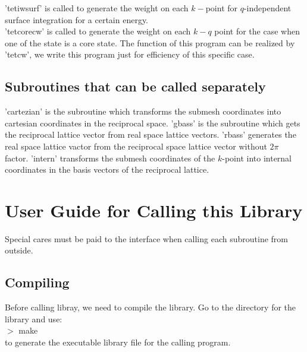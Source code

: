 \documentclass[10pt]{article}
\begin{document}
'tetiwsurf' is called to generate the weight on each $k-$point for $q$-independent surface integration for a certain energy.  \\


'tetcorecw' is called to generate the weight on each $k-q$ point for the case when one of the state is a core state. The function of this program can be realized by 'tetcw', we write this program just for efficiency of this specific case. \\


\subsection{Subroutines that can be called separately}


'cartezian' is the subroutine which transforms the submesh coordinates into cartesian coordinates in the reciprocal space. 'gbass' is the subroutine which gets the reciprocal lattice vector from real space lattice vectors. 'rbass' generates the real space lattice vactor from the reciprocal space lattice vector without $2\pi$ factor. 'intern' transforms the submesh coordinates of the $k$-point into internal coordinates in the basis vectors of the reciprocal lattice. \\


\newpage


\section{User Guide for Calling this Library}




Special cares must be paid to the interface when calling each subroutine from outside.\\


\subsection{Compiling}


Before calling libray, we need to compile the library. Go to the directory for the library and use:\\


      $>$ make\\
      

to generate the executable library file for the calling program.   \\
\end{document}
